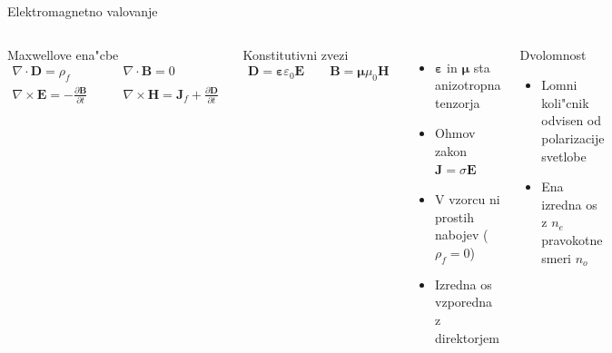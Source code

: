 \documentclass{beamer}
\newcommand{\odvod}[2]{\frac{\partial #1}{\partial #2}}
\renewcommand{\vec}{\mathbf}
\newcommand{\eps}{\varepsilon}
\begin{document}
\begin{frame}{Elektromagnetno valovanje}
\begin{columns}

 
\begin{block}{Maxwellove ena"cbe}
\begin{equation*}
\begin{aligned}
 \nabla \cdot \vec D = \rho_f & \qquad \nabla \cdot \vec B = 0 \\
 \nabla \times \vec E = -\odvod{\vec B}{t} & \qquad \nabla \times \vec H = \vec J_f + \odvod{\vec D}{t}
\end{aligned} 
\end{equation*}
\end{block}

\begin{block}{Konstitutivni zvezi}
\begin{equation*}
\begin{aligned}
\vec D = \boldsymbol\varepsilon \varepsilon_0 \vec E \qquad \vec B = \boldsymbol \mu \mu_0 \vec H
\end{aligned} 
\end{equation*}
\end{block}

\begin{itemize}
 \item $\boldsymbol\eps$ in $\boldsymbol\mu$ sta anizotropna tenzorja
 \item Ohmov zakon $\vec J = \sigma \vec E$
 \item V vzorcu ni prostih nabojev ($\rho_f = 0$)
 \item Izredna os vzporedna z direktorjem
\end{itemize}

\begin{block}{Dvolomnost}
\begin{itemize}
 \item Lomni koli"cnik odvisen od polarizacije svetlobe
 \item Ena izredna os z $n_e$ pravokotne smeri $n_o$
\end{itemize}
\end{block}


\end{columns}
\end{frame}
\end{document}
